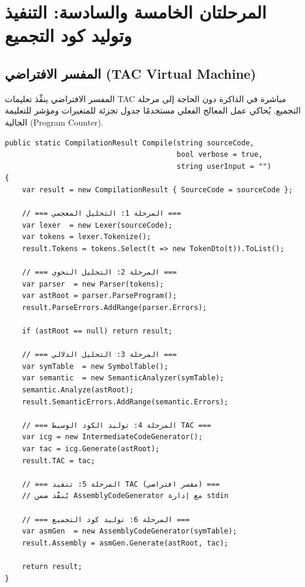 \documentclass[12pt,a4paper]{report}
\newcommand{\filename}[1]{\textcolor{SecondaryBlue}{\texttt{#1}}}
\begin{document}
\chapter{المرحلتان الخامسة والسادسة: التنفيذ وتوليد كود التجميع}

\section{المفسر الافتراضي (TAC Virtual Machine)}

المفسر الافتراضي ينفِّذ تعليمات TAC مباشرة في الذاكرة دون الحاجة إلى مرحلة التجميع. يُحاكي عمل المعالج الفعلي مستخدمًا جدول تجزئة للمتغيرات ومؤشر للتعليمة الحالية (Program Counter).

\begin{CodeBox}[title={\filename{CompilerRunner.cs} — تسلسل تشغيل المراحل الست}]
\begin{lstlisting}[style=CSharpStyle]
public static CompilationResult Compile(string sourceCode,
                                        bool verbose = true,
                                        string userInput = "")
{
    var result = new CompilationResult { SourceCode = sourceCode };

    // === المرحلة 1: التحليل المعجمي ===
    var lexer  = new Lexer(sourceCode);
    var tokens = lexer.Tokenize();
    result.Tokens = tokens.Select(t => new TokenDto(t)).ToList();

    // === المرحلة 2: التحليل النحوي ===
    var parser  = new Parser(tokens);
    var astRoot = parser.ParseProgram();
    result.ParseErrors.AddRange(parser.Errors);

    if (astRoot == null) return result;

    // === المرحلة 3: التحليل الدلالي ===
    var symTable  = new SymbolTable();
    var semantic  = new SemanticAnalyzer(symTable);
    semantic.Analyze(astRoot);
    result.SemanticErrors.AddRange(semantic.Errors);

    // === المرحلة 4: توليد الكود الوسيط TAC ===
    var icg = new IntermediateCodeGenerator();
    var tac = icg.Generate(astRoot);
    result.TAC = tac;

    // === المرحلة 5: تنفيذ TAC (مفسر افتراضي) ===
    // يُنفَّذ ضمن AssemblyCodeGenerator مع إدارة stdin

    // === المرحلة 6: توليد كود التجميع ===
    var asmGen  = new AssemblyCodeGenerator(symTable);
    result.Assembly = asmGen.Generate(astRoot, tac);

    return result;
}
\end{lstlisting}
\end{CodeBox}
\end{document}
